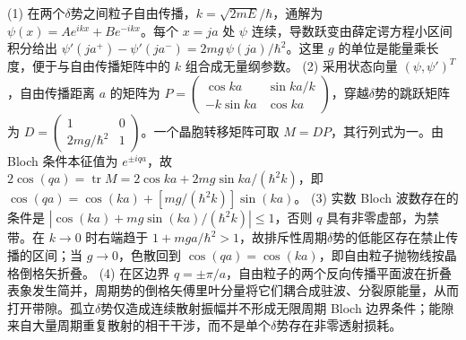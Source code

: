 (1) 在两个\(\delta \)势之间粒子自由传播，\(k=\sqrt{2mE}/\hbar\)，通解为 \(\psi(x)=Ae^{ikx}+Be^{-ikx}\)。每个 \(x=ja\) 处 \(\psi\) 连续，导数跃变由薛定谔方程小区间积分给出 \(\psi'(ja^+)-\psi'(ja^-)=2mg\,\psi(ja)/\hbar^2\)。这里 \(g\) 的单位是能量乘长度，便于与自由传播矩阵中的 \(k\) 组合成无量纲参数。
(2) 采用状态向量 \((\psi,\psi')^T\)，自由传播距离 \(a\) 的矩阵为 \(P=\begin{pmatrix}\cos ka&\sin ka/k\\-k\sin ka&\cos ka\end{pmatrix}\)，穿越\(\delta \)势的跳跃矩阵为 \(D=\begin{pmatrix}1&0\\2mg/\hbar^2&1\end{pmatrix}\)。一个晶胞转移矩阵可取 \(M=DP\)，其行列式为一。由 Bloch 条件本征值为 \(e^{\pm iqa}\)，故 \(2\cos(qa)=\operatorname{tr}M=2\cos ka+2mg\sin ka/(\hbar^2k)\)，即 \(\cos(qa)=\cos(ka)+[mg/(\hbar^2k)]\sin(ka)\)。
(3) 实数 Bloch 波数存在的条件是 \(|\cos(ka)+mg\sin(ka)/(\hbar^2k)|\le1\)，否则 \(q\) 具有非零虚部，为禁带。在 \(k\to0\) 时右端趋于 \(1+mga/\hbar^2>1\)，故排斥性周期\(\delta \)势的低能区存在禁止传播的区间；当 \(g\to0\)，色散回到 \(\cos(qa)=\cos(ka)\)，即自由粒子抛物线按晶格倒格矢折叠。
(4) 在区边界 \(q=\pm\pi/a\)，自由粒子的两个反向传播平面波在折叠表象发生简并，周期势的倒格矢傅里叶分量将它们耦合成驻波、分裂原能量，从而打开带隙。孤立\(\delta \)势仅造成连续散射振幅并不形成无限周期 Bloch 边界条件；能隙来自大量周期重复散射的相干干涉，而不是单个\(\delta \)势存在非零透射损耗。
